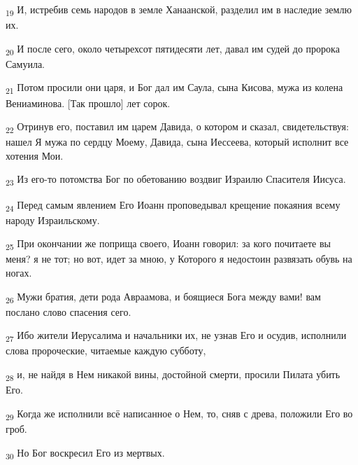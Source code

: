 \begin{tcolorbox}
\textsubscript{19} И, истребив семь народов в земле Ханаанской, разделил им в наследие землю их.
\end{tcolorbox}
\begin{tcolorbox}
\textsubscript{20} И после сего, около четырехсот пятидесяти лет, давал им судей до пророка Самуила.
\end{tcolorbox}
\begin{tcolorbox}
\textsubscript{21} Потом просили они царя, и Бог дал им Саула, сына Кисова, мужа из колена Вениаминова. [Так прошло] лет сорок.
\end{tcolorbox}
\begin{tcolorbox}
\textsubscript{22} Отринув его, поставил им царем Давида, о котором и сказал, свидетельствуя: нашел Я мужа по сердцу Моему, Давида, сына Иессеева, который исполнит все хотения Мои.
\end{tcolorbox}
\begin{tcolorbox}
\textsubscript{23} Из его-то потомства Бог по обетованию воздвиг Израилю Спасителя Иисуса.
\end{tcolorbox}
\begin{tcolorbox}
\textsubscript{24} Перед самым явлением Его Иоанн проповедывал крещение покаяния всему народу Израильскому.
\end{tcolorbox}
\begin{tcolorbox}
\textsubscript{25} При окончании же поприща своего, Иоанн говорил: за кого почитаете вы меня? я не тот; но вот, идет за мною, у Которого я недостоин развязать обувь на ногах.
\end{tcolorbox}
\begin{tcolorbox}
\textsubscript{26} Мужи братия, дети рода Авраамова, и боящиеся Бога между вами! вам послано слово спасения сего.
\end{tcolorbox}
\begin{tcolorbox}
\textsubscript{27} Ибо жители Иерусалима и начальники их, не узнав Его и осудив, исполнили слова пророческие, читаемые каждую субботу,
\end{tcolorbox}
\begin{tcolorbox}
\textsubscript{28} и, не найдя в Нем никакой вины, достойной смерти, просили Пилата убить Его.
\end{tcolorbox}
\begin{tcolorbox}
\textsubscript{29} Когда же исполнили всё написанное о Нем, то, сняв с древа, положили Его во гроб.
\end{tcolorbox}
\begin{tcolorbox}
\textsubscript{30} Но Бог воскресил Его из мертвых.
\end{tcolorbox}
